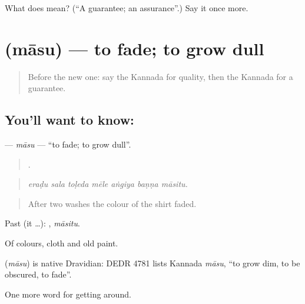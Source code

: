 \begin{tcolorbox}[breakable,colback=teal!4,colframe=teal!35!black,title={Before you move on}]
What does  mean? (\textquotedblleft{}A guarantee; an assurance\textquotedblright{}.) Say it once more.
\end{tcolorbox}
\section[\texorpdfstring{\kn{ಮಾಸು} (māsu)}{ಮಾಸು (māsu)}]{ (māsu) — to fade; to grow dull}

\label{lesson:KA-C468-masu}



\begin{quote}
Before the new one: say the Kannada for quality, then the Kannada for a guarantee.
\end{quote}

\subsection*{You'll want to know: }
\textbf{} — \emph{māsu} — \textquotedblleft{}to fade; to grow dull\textquotedblright{}.

\begin{quote}
      .
\end{quote}

\begin{quote}
\emph{eraḍu sala toḷeda mēle aṅgiya baṇṇa māsitu.}
\end{quote}

\begin{quote}
After two washes the colour of the shirt faded.
\end{quote}

Past (it …): , \emph{māsitu}.

Of colours, cloth and old paint.

\begin{cousinweb}
\textbf{} (\emph{māsu}) is native Dravidian: DEDR 4781 lists Kannada \emph{māsu}, \textquotedblleft{}to grow dim, to be obscured, to fade\textquotedblright{}.
\end{cousinweb}

\begin{grammarlens}[title={What you've built}]
One more word for getting around.
\end{grammarlens}

